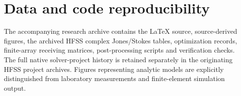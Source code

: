 \documentclass{ieeeaccess}
\begin{document}
\section*{Data and code reproducibility}
The accompanying research archive contains the LaTeX source, source-derived figures, the archived HFSS complex Jones/Stokes tables, optimization records, finite-array receiving matrices, post-processing scripts and verification checks. The full native solver-project history is retained separately in the originating HFSS project archives. Figures representing analytic models are explicitly distinguished from laboratory measurements and finite-element simulation output.\par


\EOD
\end{document}
